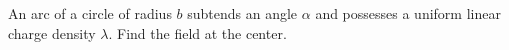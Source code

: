 An arc of a circle of radius $b$ subtends an angle $\alpha$ and possesses
a uniform linear charge density $\lambda$. Find the field at
the center.\answercheck

